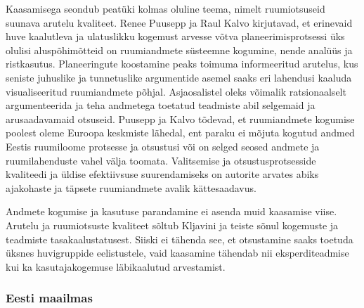 \documentclass[estonian,]{article}
\begin{document}
Kaasamisega seondub peatüki kolmas oluline teema, nimelt ruumiotsuseid suunava arutelu kvaliteet. Renee Puusepp ja Raul Kalvo kirjutavad, et erinevaid huve kaalutleva ja ulatuslikku kogemust arvesse võtva planeerimisprotsessi üks olulisi aluspõhimõtteid on ruumiandmete süsteemne kogumine, nende analüüs ja ristkasutus. Planeeringute koostamine peaks toimuma informeeritud arutelus, kus seniste juhuslike ja tunnetuslike argumentide asemel saaks eri lahendusi kaaluda visualiseeritud ruumiandmete põhjal. Asjaosalistel oleks võimalik ratsionaalselt argumenteerida ja teha andmetega toetatud teadmiste abil selgemaid ja arusaadavamaid otsuseid. Puusepp ja Kalvo tõdevad, et ruumiandmete kogumise poolest oleme Euroopa keskmiste lähedal, ent paraku ei mõjuta kogutud andmed Eestis ruumiloome protsesse ja otsustusi või on selged seosed andmete ja ruumilahenduste vahel välja toomata. Valitsemise ja otsustusprotsesside kvaliteedi ja üldise efektiivsuse suurendamiseks on autorite arvates abiks ajakohaste ja täpsete ruumiandmete avalik kättesaadavus.

Andmete kogumise ja kasutuse parandamine ei asenda muid kaasamise viise. Arutelu ja ruumiotsuste kvaliteet sõltub Kljavini ja teiste sõnul kogemuste ja teadmiste tasakaalustatusest. Siiski ei tähenda see, et otsustamine saaks toetuda üksnes huvigruppide eelistustele, vaid kaasamine tähendab nii eksperditeadmise kui ka kasutajakogemuse läbikaalutud arvestamist.

\hypertarget{eesti-maailmas-1}{%
\subsubsection*{Eesti maailmas}\label{eesti-maailmas-1}}
\end{document}
